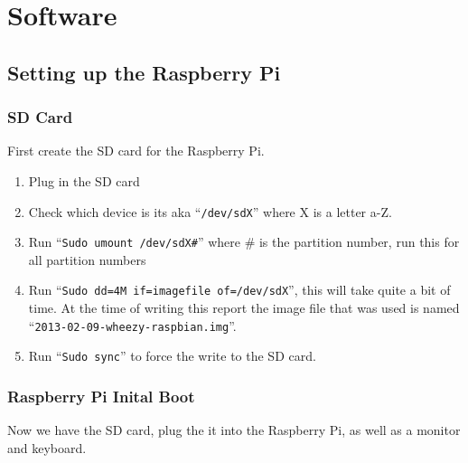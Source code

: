 \documentclass{article}
\begin{document}
\section{Software}
\subsection{Setting up the Raspberry Pi}
\subsubsection{SD Card}
First create the SD card for the Raspberry Pi.

\begin{enumerate}
    \item Plug in the SD card
    \item Check which device is its aka ``{\tt /dev/sdX}'' where X is a letter a-Z.
    \item Run ``{\tt Sudo umount /dev/sdX\#}'' where \# is the partition number, run this for all partition numbers
    \item Run ``{\tt Sudo dd=4M if=imagefile of=/dev/sdX}'', this will take quite a bit of time. At the time of writing this report the image file that was used is named ``{\tt 2013-02-09-wheezy-raspbian.img}''.
    \item Run ``{\tt Sudo sync}'' to force the write to the SD card.
\end{enumerate}

\subsubsection{Raspberry Pi Inital Boot}
Now we have the SD card, plug the it into the Raspberry Pi, as well as a monitor and keyboard.
\end{document}
